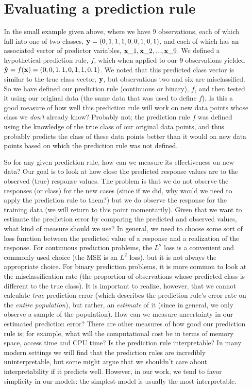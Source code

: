 

\chapter{Evaluating a prediction rule}
\label{ch:eval}

In the small example given above, where we have 9 observations, each of which fall into one of two classes, ${\bf y} = (0, 1, 1, 1, 0, 0, 1, 0, 1)$, and each of which has an associated vector of predictor variables, ${\bf x}\_1, {\bf x}\_2, ..., {\bf x}\_9$. We defined a hypothetical prediction rule, $f$, which when applied to our 9 observations yielded ${\bf \hat{y}} = f({\bf x}) = (0, 0, 1, 1, 0, 1, 1, 0, 1)$. We noted that this predicted class vector is similar to the true class vector, ${\bf y}$, but observations two and six are misclassified. So we have defined our prediction rule (continuous or binary), $f$, and then tested it using our original data (the same data that was used to define $f$). Is this a good measure of how well this prediction rule will work on new data points whose class we \textit{don't} already know? Probably not; the prediction rule $f$ was defined using the knowledge of the true class of our original data points, and thus probably predicts the class of these data points better than it would on new data points based on which the prediction rule was not defined.


So for any given prediction rule, how can we measure its effectiveness on new data? Our goal is to look at how close the predicted response values are to the observed (true) response values. The problem is that we do not observe the responses (or class) for the new cases (since if we did, why would we need to apply the prediction rule to them?) but we do observe the response for the training data (we will return to this point momentarily). Given that we want to estimate the prediction error by comparing the predicted and observed values, what kind of measure should we use? In general, we need to choose some sort of loss function between the predicted value of a response and a realization of the response. For continuous prediction problems, the $L^2$ loss is a convenient and commonly used choice (the MSE is an $L^2$ loss), but it is not always the appropriate choice. For binary prediction problems, it is more common to look at the misclassification rate (the proportion of observations whose predicted class is different to the true class). It is important to realize, however, that we cannot calculate \textit{true} prediction error (which describes the prediction rule's error rate on the \textit{entire population}), but rather, an \textit{estimate} of it (since in general, we only observe a sample of the population). How can we measure uncertainty in our estimated prediction error? There are other measures of how good our prediction rule is; for example, what will the computational cost be in terms of memory space, access time and CPU time? Is the prediction rule interpretable? In many modern settings we will find that the prediction rules are incredibly uninterpretable, but some might argue that we shouldn't care about interpretability if it predicts well. However, in our work, we tend to favor simplicity in our models: the simplest model is usually the most interpretable.

